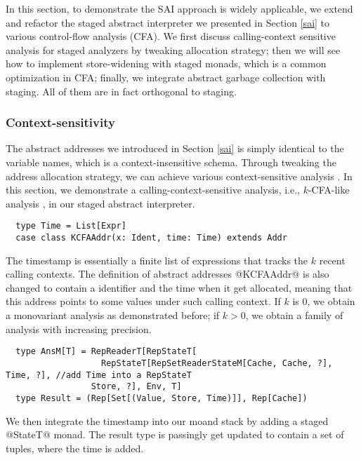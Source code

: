 In this section, to demonstrate the SAI approach is widely applicable, we extend
and refactor the staged abstract interpreter we presented in Section \ref{sai}
to various control-flow analysis (CFA). We first discuss calling-context
sensitive analysis for staged analyzers by tweaking allocation strategy; then we
will see how to implement store-widening with staged monads, which is a common
optimization in CFA; finally, we integrate abstract garbage collection with
staging. All of them are in fact orthogonal to staging.

\subsubsection{Context-sensitivity}

The abstract addresses we introduced in Section \ref{sai} is simply identical to
the variable names, which is a context-insensitive schema.
Through tweaking the address allocation strategy, we can achieve various
context-sensitive analysis \cite{DBLP:conf/icfp/Gilray0M16}. In this section, we
demonstrate a calling-context-sensitive analysis, i.e., $k$-CFA-like analysis
\cite{DBLP:journals/jfp/HornM12}, in our staged abstract interpreter.

\begin{lstlisting}
  type Time = List[Expr]
  case class KCFAAddr(x: Ident, time: Time) extends Addr
\end{lstlisting}

The timestamp is essentially a finite list of expressions that tracks the $k$
recent calling contexts. The definition of abstract addresses @KCFAAddr@ is also
changed to contain a identifier and the time when it get allocated, meaning that
this address points to some values under such calling context. If $k$ is 0, we
obtain a monovariant analysis as demonstrated before; if $k > 0$, we obtain a
family of analysis with increasing precision.

\begin{lstlisting}
  type AnsM[T] = RepReaderT[RepStateT[
                   RepStateT[RepSetReaderStateM[Cache, Cache, ?], Time, ?], //add Time into a RepStateT
                 Store, ?], Env, T]
  type Result = (Rep[Set[(Value, Store, Time)]], Rep[Cache])
\end{lstlisting}

We then integrate the timestamp into our moand stack by adding a staged
@StateT@ monad. The result type is passingly get updated to contain a set of
tuples, where the time is added.


